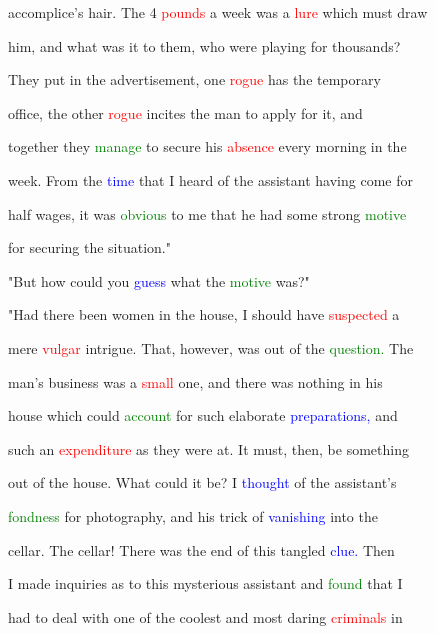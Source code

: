  accomplice's hair. The 4 \textcolor{red}{pounds} a week was a \textcolor{red}{lure} which must draw

 him, and what was it to them, who were playing for thousands?

 They put in the advertisement, one \textcolor{red}{rogue} has the temporary

 office, the other \textcolor{red}{rogue} incites the man to apply for it, and

 together they \textcolor{green}{manage} to secure his \textcolor{red}{absence} every morning in the

 week. From the \textcolor{blue}{time} that I heard of the assistant having come for

 half wages, it was \textcolor{green}{obvious} to me that he had some strong \textcolor{green}{motive}

 for securing the situation."



 "But how could you \textcolor{blue}{guess} what the \textcolor{green}{motive} was?"



 "Had there been women in the house, I should have \textcolor{red}{suspected} a

 mere \textcolor{red}{vulgar} \textcolor{BurntOrange}{intrigue.} That, however, was out of the \textcolor{green}{question.} The

 man's business was a \textcolor{red}{small} one, and there was nothing in his

 house which could \textcolor{green}{account} for such elaborate \textcolor{blue}{preparations,} and

 such an \textcolor{red}{expenditure} as they were at. It must, then, be something

 out of the house. What could it be? I \textcolor{blue}{thought} of the assistant's

 \textcolor{green}{fondness} for photography, and his \textcolor{BurntOrange}{trick} of \textcolor{blue}{vanishing} into the

 cellar. The cellar! There was the end of this tangled \textcolor{blue}{clue.} Then

 I made \textcolor{BurntOrange}{inquiries} as to this \textcolor{BurntOrange}{mysterious} assistant and \textcolor{green}{found} that I

 had to \textcolor{BurntOrange}{deal} with one of the coolest and most \textcolor{BurntOrange}{daring} \textcolor{red}{criminals} in

